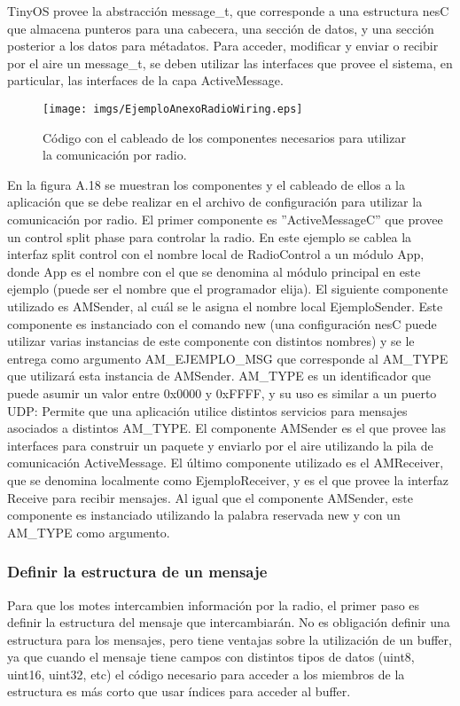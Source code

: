 TinyOS provee la abstracción message\_t, que corresponde a una estructura nesC que almacena punteros para una cabecera, una sección de datos, y una sección posterior a los datos para métadatos. Para acceder, modificar y enviar o recibir por el aire un message\_t, se deben utilizar las interfaces que provee el sistema, en particular, las interfaces de la capa ActiveMessage.

\begin{center}
\begin{figure}[H]
\centering
\texttt{[image: imgs/EjemploAnexoRadioWiring.eps]} 
\caption{Código con el cableado de los componentes necesarios para utilizar la comunicación por radio.}
\end{figure}
\end{center}

En la figura A.18 se muestran los componentes y el cableado de ellos a la aplicación que se debe realizar en el archivo de configuración para utilizar la comunicación por radio. El primer componente es ''ActiveMessageC'' que provee un control split phase para controlar la radio. En este ejemplo se cablea la interfaz split control con el nombre local de RadioControl a un módulo App, donde App es el nombre con el que se denomina al módulo principal en este ejemplo (puede ser el nombre que el programador elija). El siguiente componente utilizado es AMSender, al cuál se le asigna el nombre local EjemploSender. Este componente es instanciado con el comando new (una configuración nesC puede utilizar varias instancias de este componente con distintos nombres) y se le entrega como argumento AM\_EJEMPLO\_MSG que corresponde al AM\_TYPE que utilizará esta instancia de AMSender. AM\_TYPE es un identificador que puede asumir un valor entre 0x0000 y 0xFFFF, y su uso es similar a un puerto UDP: Permite que una aplicación utilice distintos servicios para mensajes asociados a distintos AM\_TYPE. El componente AMSender es el que provee las interfaces para construir un paquete y enviarlo por el aire utilizando la pila de comunicación ActiveMessage. El último componente utilizado es el AMReceiver, que se denomina localmente como EjemploReceiver, y es el que provee la interfaz Receive para recibir mensajes. Al igual que el componente AMSender, este componente es instanciado utilizando la palabra reservada new y con un AM\_TYPE como argumento.

\subsubsection{Definir la estructura de un mensaje} 
Para que los motes intercambien información por la radio, el primer paso es definir la estructura del mensaje que intercambiarán. No es obligación definir una estructura para los mensajes, pero tiene ventajas sobre la utilización de un buffer, ya que cuando el mensaje tiene campos con distintos tipos de datos (uint8, uint16, uint32, etc)  el código necesario para acceder a los miembros de la estructura es más corto que usar índices para acceder al buffer.  

